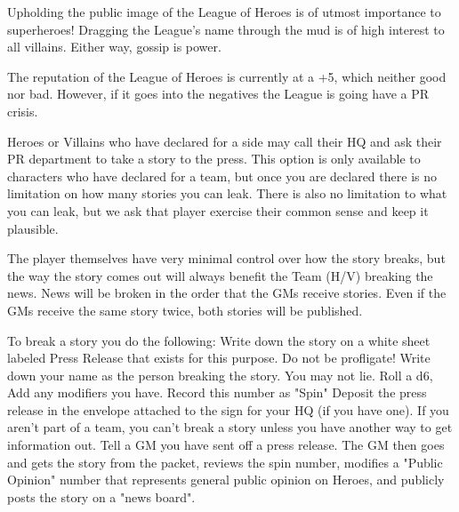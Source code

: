 \documentclass[green]{LRSguildcamp1}
\begin{document}
\name{\gPR{}}

Upholding the public image of the League of Heroes is of utmost importance to superheroes! 
Dragging the League's name through the mud is of high interest to all villains. Either way, gossip is power. 

The reputation of the League of Heroes is currently at a +5, which neither good nor bad. However, if it goes into the negatives the League is going have a PR crisis. 

Heroes or Villains who have declared for a side may call their HQ and ask their PR department to take a story to the press. This option is only available to characters who have declared for a team, but once you are declared there is no limitation on how many stories you can leak. There is also no limitation to what you can leak, but we ask that player exercise their common sense and keep it plausible. 

The player themselves have very minimal control over how the story breaks, but the way the story comes out will always benefit the Team (H/V) breaking the news. News will be broken in the order that the GMs receive stories. Even if the GMs receive the same story twice, both stories will be published. 

To break a story you do the following:
Write down the story on a white sheet labeled Press Release that exists for this purpose. Do not be profligate! 
Write down your name as the person breaking the story. You may not lie. 
Roll a d6, Add any modifiers you have. Record this number as "Spin"
Deposit the press release in the envelope attached to the sign for your HQ (if you have one). If you aren't part of a team, you can't break a story unless you have another way to get information out. Tell a GM you have sent off a press release.
The GM then goes and gets the story from the packet, reviews the spin number, modifies a "Public Opinion" number that represents general public opinion on Heroes, and publicly posts the story on a "news board". 

\end{document}
